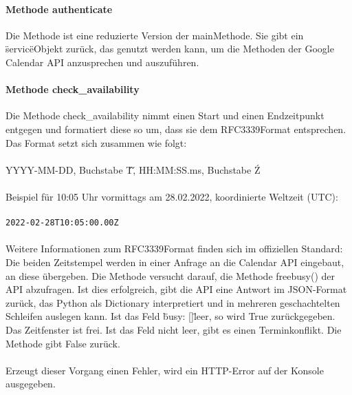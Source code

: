             
            \paragraph{Methode authenticate}
                Die Methode ist eine reduzierte Version der main\-Methode. Sie gibt ein \"service\"\-Objekt zurück, das genutzt werden kann, um die Methoden der Google Calendar API anzusprechen und auszuführen. 
      

            \paragraph{Methode check\_availability}
                Die Methode check\_availability nimmt einen Start\- und einen Endzeitpunkt entgegen und formatiert diese so um, dass sie dem RFC3339\-Format entsprechen. Das Format setzt sich zusammen wie folgt: \\
                \\
                YYYY-MM-DD, Buchstabe \'T\', HH:MM:SS.ms, Buchstabe \'Z\' \\
                \\
                Beispiel für 10:05 Uhr vormittags am 28.02.2022, koordinierte Weltzeit (UTC): \\
                \\
                \verb/2022-02-28T10:05:00.00Z/ \\
                \\
                Weitere Informationen zum RFC3339\-Format finden sich im offiziellen Standard: \cite{date_time} \\

                Die beiden Zeitstempel werden in einer Anfrage an die Calendar API eingebaut, an diese übergeben. Die Methode versucht darauf, die Methode freebusy() der API abzufragen. Ist dies erfolgreich, gibt die API eine Antwort im JSON-Format zurück, das Python als Dictionary interpretiert und in mehreren geschachtelten Schleifen auslegen kann. Ist das Feld \"busy: []\" leer, so wird True zurückgegeben. Das Zeitfenster ist frei. Ist das Feld nicht leer, gibt es einen Terminkonflikt. Die Methode gibt False zurück. \\
                \\
                Erzeugt dieser Vorgang einen Fehler, wird ein HTTP-Error auf der Konsole ausgegeben. 


